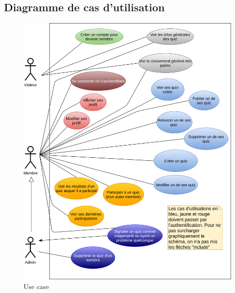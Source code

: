 \documentclass[a4paper, 12pt]{article}
\begin{document}
\subsection{Diagramme de cas d'utilisation}
\begin{figure}
	\begin{center}
		\includegraphics[width=1.0\textwidth]{../diagrams/UseCaseQuiz.png}
	\end{center}
    \caption{Use case}
\end{figure}
\end{document}
